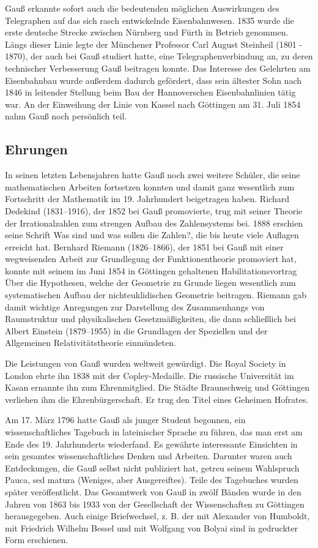 \documentclass[10pt]{article}
\begin{document}
Gauß erkannte sofort auch die bedeutenden möglichen Auswirkungen des
Telegraphen auf das sich rasch entwickelnde Eisenbahnwesen. 1835 wurde die
erste deutsche Strecke zwischen Nürnberg und Fürth in Betrieb genommen. Längs
dieser Linie legte der Münchener Professor Carl August Steinheil (1801 -
1870), der auch bei Gauß studiert hatte, eine Telegraphenverbindung an, zu
deren technischer Verbesserung Gauß beitragen konnte. Das Interesse des
Gelehrten am Eisenbahnbau wurde außerdem dadurch gefördert, dass sein ältester
Sohn nach 1846 in leitender Stellung beim Bau der Hannoverschen
Eisenbahnlinien tätig war. An der Einweihung der Linie von Kassel nach
Göttingen am 31. Juli 1854 nahm Gauß noch persönlich teil.

\subsection{Ehrungen}

In seinen letzten Lebensjahren hatte Gauß noch zwei weitere Schüler, die seine
mathematischen Arbeiten fortsetzen konnten und damit ganz wesentlich zum
Fortschritt der Mathematik im 19. Jahrhundert beigetragen haben. Richard
Dedekind (1831--1916), der 1852 bei Gauß promovierte, trug mit seiner Theorie
der Irrationalzahlen zum strengen Aufbau des Zahlensystems bei. 1888 erschien
seine Schrift {\glqq}Was sind und was sollen die Zahlen?{\grqq}, die bis heute
viele Auflagen erreicht hat. Bernhard Riemann (1826--1866), der 1851 bei Gauß
mit einer wegweisenden Arbeit zur Grundlegung der Funktionentheorie promoviert
hat, konnte mit seinem im Juni 1854 in Göttingen gehaltenen
Habilitationsvortrag {\glqq}Über die Hypothesen, welche der Geometrie zu
Grunde liegen{\grqq} wesentlich zum systematischen Aufbau der
nichteuklidischen Geometrie beitragen. Riemann gab damit wichtige Anregungen
zur Darstellung des Zusammenhangs von Raumstruktur und physikalischen
Gesetzmäßigkeiten, die dann schließlich bei Albert Einstein (1879--1955) in
die Grundlagen der Speziellen und der Allgemeinen Relativitätstheorie
einmündeten.

Die Leistungen von Gauß wurden weltweit gewürdigt. Die Royal Society in London
ehrte ihn 1838 mit der Copley-Medaille. Die russische Universität im Kasan
ernannte ihn zum Ehrenmitglied. Die Städte Braunschweig und Göttingen
verliehen ihm die Ehrenbürgerschaft. Er trug den Titel eines Geheimen
Hofrates.

Am 17. März 1796 hatte Gauß als junger Student begonnen, ein
wissenschaftliches Tagebuch in lateinischer Sprache zu führen, das man erst am
Ende des 19. Jahrhunderts wiederfand. Es gewährte interessante Einsichten in
sein gesamtes wissenschaftliches Denken und Arbeiten. Darunter waren auch
Entdeckungen, die Gauß selbst nicht publiziert hat, getreu seinem Wahlspruch
{\glqq}Pauca, sed matura{\grqq} (Weniges, aber Ausgereiftes). Teile des
Tagebuches wurden später veröffentlicht. Das Gesamtwerk von Gauß in zwölf
Bänden wurde in den Jahren von 1863 bis 1933 von der Gesellschaft der
Wissenschaften zu Göttingen herausgegeben. Auch einige Briefwechsel, z. B. der
mit Alexander von Humboldt, mit Friedrich Wilhelm Bessel und mit Wolfgang von
Bolyai sind in gedruckter Form erschienen.
\end{document}

